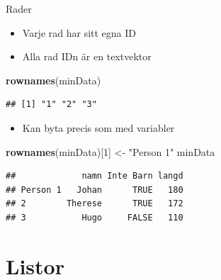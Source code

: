\documentclass[
  11pt,
  ignorenonframetext,
]{beamer}
\newenvironment{Shaded}{\begin{snugshade}}{\end{snugshade}}
\newcommand{\DecValTok}[1]{\textcolor[rgb]{0.00,0.00,0.81}{#1}}
\newcommand{\KeywordTok}[1]{\textcolor[rgb]{0.13,0.29,0.53}{\textbf{#1}}}
\newcommand{\NormalTok}[1]{#1}
\newcommand{\StringTok}[1]{\textcolor[rgb]{0.31,0.60,0.02}{#1}}
\providecommand{\tightlist}{%
  \setlength{\itemsep}{0pt}\setlength{\parskip}{0pt}}
\begin{document}

\begin{frame}[fragile]{Rader}
\protect\hypertarget{rader}{}
\begin{itemize}
\tightlist
\item
  Varje rad har sitt egna ID
\item
  Alla rad IDn är en textvektor
\end{itemize}

\begin{Shaded}
\begin{Highlighting}[]
\KeywordTok{rownames}\NormalTok{(minData)}
\end{Highlighting}
\end{Shaded}

\begin{verbatim}
## [1] "1" "2" "3"
\end{verbatim}

\pause

\begin{itemize}
\tightlist
\item
  Kan byta precis som med variabler
\end{itemize}

\begin{Shaded}
\begin{Highlighting}[]
\KeywordTok{rownames}\NormalTok{(minData)[}\DecValTok{1}\NormalTok{] \textless{}{-}}\StringTok{ "Person 1"}
\NormalTok{minData}
\end{Highlighting}
\end{Shaded}

\begin{verbatim}
##             namn Inte Barn langd
## Person 1   Johan      TRUE   180
## 2        Therese      TRUE   172
## 3           Hugo     FALSE   110
\end{verbatim}
\end{frame}

\hypertarget{listor}{%
\section{Listor}\label{listor}}

\end{document}
